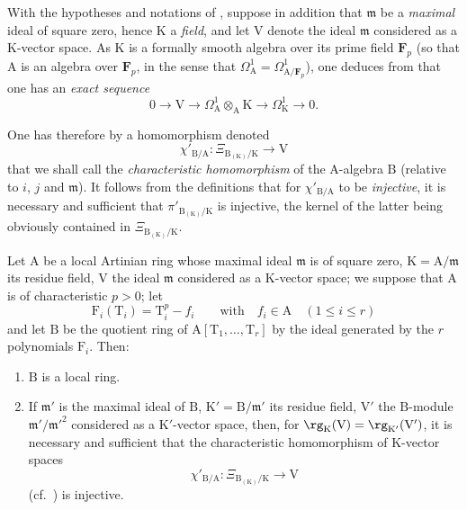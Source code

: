 \begin{env}[22.4.6]
\label{0.22.4.6}
With the hypotheses and notations of , suppose in addition that $\mathfrak{m}$ be a \emph{maximal} ideal of square zero, hence $\mathrm{K}$ a \emph{field}, and let $\mathrm{V}$ denote the ideal $\mathfrak{m}$ considered as a $\mathrm{K}$-vector space.
As $\mathrm{K}$ is a formally smooth algebra over its prime field $\mathbf{F}_p$  (so that $\mathrm{A}$ is an algebra over $\mathbf{F}_p$, in the sense that $\Omega^1_\mathrm{A}=\Omega^1_{\mathrm{A}/\mathbf{F}_p}$), one deduces from  that one has an \emph{exact sequence}
\[
\label{0.22.4.6.1}
  0\to\mathrm{V}\to\Omega^1_\mathrm{A}\otimes_\mathrm{A}\mathrm{K}\to\Omega^1_\mathrm{K}\to 0.
  \tag{22.4.6.1}
\]

One has therefore by  a homomorphism denoted
\[
\label{0.22.4.6.2}
  \chi'_{\mathrm{B}/\mathrm{A}}:\Xi_{\mathrm{B}_{(\mathrm{K})}/\mathrm{K}}\to\mathrm{V}
  \tag{22.4.6.2}
\]
that we shall call the \emph{characteristic homomorphism} of the $\mathrm{A}$-algebra $\mathrm{B}$ (relative to $i$, $j$ and $\mathfrak{m}$).
It follows from the definitions that for $\chi'_{\mathrm{B}/\mathrm{A}}$ to be \emph{injective}, it is necessary and sufficient that $\pi'_{\mathrm{B}_{(\mathrm{K})}/\mathrm{K}}$ is injective, the kernel of the latter being obviously contained in $\Xi_{\mathrm{B}_{(\mathrm{K})}/\mathrm{K}}$.
\end{env}

\begin{proposition}[22.4.7]
\label{0.22.4.7}
Let $\mathrm{A}$ be a local Artinian ring whose maximal ideal $\mathfrak{m}$ is of square zero, $\mathrm{K}=\mathrm{A}/\mathfrak{m}$ its residue field, $\mathrm{V}$ the ideal $\mathfrak{m}$ considered as a $\mathrm{K}$-vector space; we suppose that $\mathrm{A}$ is of characteristic $p>0$; let
\[
\label{0.22.4.7.1}
  \mathrm{F}_i(\mathrm{T}_i)=\mathrm{T}_i^p-f_i\qquad\text{with}\quad f_i\in\mathrm{A}\quad(1\leq i\leq r)
  \tag{22.4.7.1}
\]
and let $\mathrm{B}$ be the quotient ring of $\mathrm{A}[\mathrm{T}_1,\ldots,\mathrm{T}_r]$ by the ideal generated by the $r$ polynomials $\mathrm{F}_i$.
Then:
\begin{enumerate}
  \item[\rm{(i)}] $\mathrm{B}$ is a local ring.
  \item[\rm{(ii)}] If $\mathfrak{m}'$ is the maximal ideal of $\mathrm{B}$, $\mathrm{K}'=\mathrm{B}/\mathfrak{m}'$ its residue field, $\mathrm{V}'$ the $\mathrm{B}$-module $\mathfrak{m}'/\mathfrak{m}'^2$ considered as a $\mathrm{K}'$-vector space, then, for $\rg_\mathrm{K}(\mathrm{V})=\rg_{\mathrm{K}'}(\mathrm{V}')$, it is necessary and sufficient that the characteristic homomorphism of $\mathrm{K}$-vector spaces
\[
\label{0.22.4.7.2}
  \chi'_{\mathrm{B}/\mathrm{A}}:\Xi_{\mathrm{B}_{(\mathrm{K})}/\mathrm{K}}\to\mathrm{V}
  \tag{22.4.7.2}
\]
  (cf.~) is injective.
\end{enumerate}
\end{proposition}

